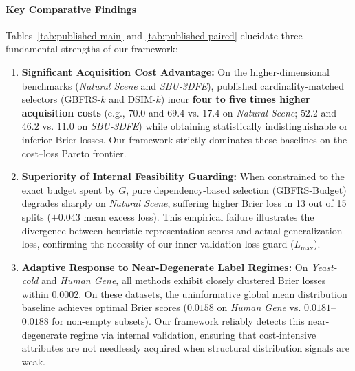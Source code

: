 \paragraph{Key Comparative Findings}
Tables~\ref{tab:published-main} and \ref{tab:published-paired} elucidate three fundamental strengths of our framework:
\begin{enumerate}[label=(\arabic*), leftmargin=*]
	\item \textbf{Significant Acquisition Cost Advantage:} On the higher-dimensional benchmarks (\textit{Natural Scene} and \textit{SBU-3DFE}), published cardinality-matched selectors (GBFRS-$k$ and DSIM-$k$) incur \textbf{four to five times higher acquisition costs} (e.g., $70.0$ and $69.4$ vs. $17.4$ on \textit{Natural Scene}; $52.2$ and $46.2$ vs. $11.0$ on \textit{SBU-3DFE}) while obtaining statistically indistinguishable or inferior Brier losses. Our framework strictly dominates these baselines on the cost--loss Pareto frontier.
	\item \textbf{Superiority of Internal Feasibility Guarding:} When constrained to the exact budget spent by $G$, pure dependency-based selection (GBFRS-Budget) degrades sharply on \textit{Natural Scene}, suffering higher Brier loss in 13 out of 15 splits ($+0.043$ mean excess loss). This empirical failure illustrates the divergence between heuristic representation scores and actual generalization loss, confirming the necessity of our inner validation loss guard ($L_{\max}$).
	\item \textbf{Adaptive Response to Near-Degenerate Label Regimes:} On \textit{Yeast-cold} and \textit{Human Gene}, all methods exhibit closely clustered Brier losses within $0.0002$. On these datasets, the uninformative global mean distribution baseline achieves optimal Brier scores ($0.0158$ on \textit{Human Gene} vs. $0.0181$--$0.0188$ for non-empty subsets). Our framework reliably detects this near-degenerate regime via internal validation, ensuring that cost-intensive attributes are not needlessly acquired when structural distribution signals are weak.
\end{enumerate}
